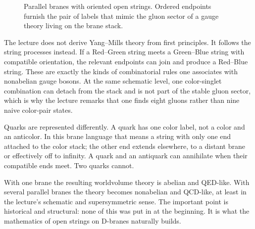 \begin{figure}[htbp]
\centering
{}
\caption{Parallel branes with oriented open strings. Ordered endpoints furnish the pair of labels that mimic the gluon sector of a gauge theory living on the brane stack.}
\end{figure}

The lecture does not derive Yang--Mills theory from first principles. It follows the string processes instead. If a Red--Green string meets a Green--Blue string with compatible orientation, the relevant endpoints can join and produce a Red--Blue string. These are exactly the kinds of combinatorial rules one associates with nonabelian gauge bosons. At the same schematic level, one color-singlet combination can detach from the stack and is not part of the stable gluon sector, which is why the lecture remarks that one finds eight gluons rather than nine naive color-pair states.

Quarks are represented differently. A quark has one color label, not a color and an anticolor. In this brane language that means a string with only one end attached to the color stack; the other end extends elsewhere, to a distant brane or effectively off to infinity. A quark and an antiquark can annihilate when their compatible ends meet. Two quarks cannot.

With one brane the resulting worldvolume theory is abelian and QED-like. With several parallel branes the theory becomes nonabelian and QCD-like, at least in the lecture's schematic and supersymmetric sense. The important point is historical and structural: none of this was put in at the beginning. It is what the mathematics of open strings on D-branes naturally builds.

